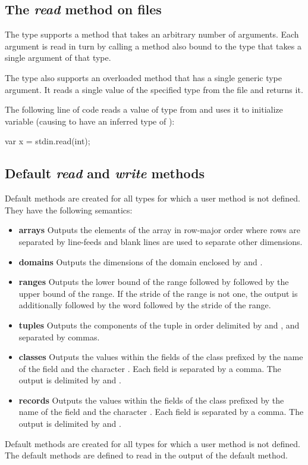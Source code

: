 \subsection{The {\em read} method on files}
\label{fileread}

The  type supports a method  that takes an
arbitrary number of arguments.  Each argument is read in turn by
calling a method also bound to the  type that takes a
single argument of that type.

The  type also supports an overloaded method 
that has a single generic type argument.  It reads a single value of
the specified type from the file and returns it.

\begin{example}
The following line of code reads a value of type  from
 and uses it to initialize variable  (causing
 to have an inferred type of ):
\begin{chapel}
var x = stdin.read(int);
\end{chapel}
\end{example}


\subsection{Default {\em read} and {\em write} methods}

Default  methods are created for all types for which a user
 method is not defined.  They have the following semantics:
\begin{itemize}
\item
{\bf arrays} Outputs the elements of the array in row-major order
where rows are separated by line-feeds and blank lines are used to
separate other dimensions.
\item
{\bf domains} Outputs the dimensions of the domain enclosed
by \chpl{[} and \chpl{]}.
\item
{\bf ranges} Outputs the lower bound of the range followed
by  followed by the upper bound of the range.  If the stride
of the range is not one, the output is additionally followed by the
word  followed by the stride of the range.
\item
{\bf tuples} Outputs the components of the tuple in order delimited
by \chpl{(} and \chpl{)}, and separated by commas.
\item
{\bf classes} Outputs the values within the fields of the class
prefixed by the name of the field and the character \chpl{=}.  Each
field is separated by a comma.  The output is delimited by \chpl{\{}
and \chpl{\}}.
\item
{\bf records} Outputs the values within the fields of the class
prefixed by the name of the field and the character \chpl{=}.  Each
field is separated by a comma.  The output is delimited by \chpl{(}
and \chpl{)}.
\end{itemize}

Default  methods are created for all types for which a user
 method is not defined.  The default  methods are
defined to read in the output of the default  method.
